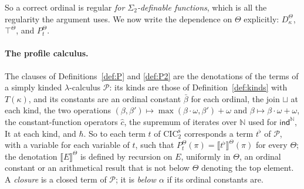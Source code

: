 \documentclass[10pt]{article}
\newcommand{\N}{\mathbb{N}}
\newcommand{\CIC}{\mathrm{CIC}}
\newcommand{\sem}[1]{\llbracket #1\rrbracket}
\newcommand{\ind}{\mathsf{ind}}
\begin{document}
So a correct ordinal is regular \emph{for $\Sigma_2$-definable functions},
which is all the regularity the argument uses. We now write the
dependence on $\Theta$ explicitly: $D^\Theta_\kappa$, $\top^\Theta$, and
$P^\Theta_t$.

\paragraph{The profile calculus.}
The clauses of Definitions~\ref{def:P} and \ref{def:P2} are the
denotations of the terms of a simply kinded $\lambda$-calculus $\mathcal P$:
its kinds are those of Definition~\ref{def:kinds} with $T(\kappa)$, and its
constants are an ordinal constant $\bar\beta$ for each ordinal, the join
$\sqcup$ at each kind, the two operations
$(\beta,\beta')\mapsto\max(\beta\cdot\omega,\beta')+\omega$ and
$\beta\mapsto\beta\cdot\omega+\omega$, the constant-function operators
$\hat c$, the supremum of iterates over $\N$ used for $\ind^\N$,
$\mathrm{It}$ at each kind, and $\hbar$. So to each term $t$ of
$\CIC_2^{\mathrm s}$ corresponds a term $t^\flat$ of $\mathcal P$, with a
variable for each variable of $t$, such that
$P^\Theta_t(\pi)=\sem{t^\flat}^\Theta(\pi)$ for every $\Theta$; the
denotation $\sem E^\Theta$ is defined by recursion on $E$, uniformly in
$\Theta$, an ordinal constant or an arithmetical result that is not below
$\Theta$ denoting the top element. A \emph{closure} is a closed term of
$\mathcal P$; it is \emph{below $\alpha$} if its ordinal constants are.
\end{document}
